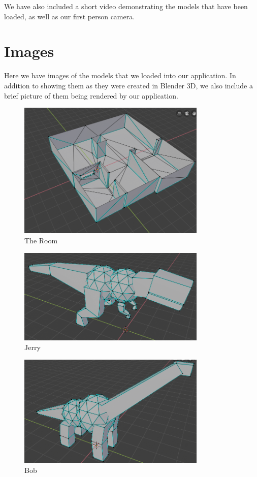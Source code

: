 \documentclass{article}[12pt]
\begin{document}
We have also included a short video demonstrating the models that have been
loaded, as well as our first person camera.

\section{Images}

Here we have images of the models that we loaded into our application. In
addition to showing them as they were created in Blender 3D, we also include a
brief picture of them being rendered by our application.

\begin{figure}[!ht]
        \centering
        \includegraphics[width=0.8\textwidth]{floorplan.png}
        \caption{The Room}
\end{figure}

\begin{figure}[!ht]
        \centering
        \includegraphics[width=0.8\textwidth]{jerry.png}
        \caption{Jerry}
\end{figure}

\begin{figure}[!ht]
        \centering
        \includegraphics[width=0.8\textwidth]{randall.png}
        \caption{Bob}
\end{figure}
\end{document}
